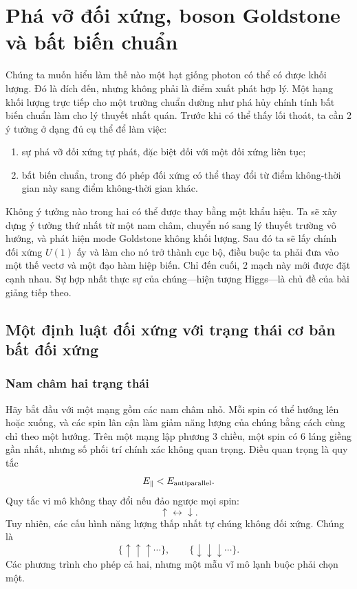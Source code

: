\chapter{Phá vỡ đối xứng, boson Goldstone và bất biến chuẩn}

Chúng ta muốn hiểu làm thế nào một hạt giống photon có thể có được khối lượng. Đó là đích đến, nhưng không phải là điểm xuất phát hợp lý. Một hạng khối lượng trực tiếp cho một trường chuẩn dường như phá hủy chính tính bất biến chuẩn làm cho lý thuyết nhất quán. Trước khi có thể thấy lối thoát, ta cần 2 ý tưởng ở dạng đủ cụ thể để làm việc:
\begin{enumerate}
  \item sự phá vỡ đối xứng tự phát, đặc biệt đối với một đối xứng liên tục;
  \item bất biến chuẩn, trong đó phép đối xứng có thể thay đổi từ điểm không-thời gian này sang điểm không-thời gian khác.
\end{enumerate}
Không ý tưởng nào trong hai có thể được thay bằng một khẩu hiệu. Ta sẽ xây dựng ý tưởng thứ nhất từ một nam châm, chuyển nó sang lý thuyết trường vô hướng, và phát hiện mode Goldstone không khối lượng. Sau đó ta sẽ lấy chính đối xứng \(U(1)\) ấy và làm cho nó trở thành cục bộ, điều buộc ta phải đưa vào một thế vectơ và một đạo hàm hiệp biến. Chỉ đến cuối, 2 mạch này mới được đặt cạnh nhau. Sự hợp nhất thực sự của chúng---hiện tượng Higgs---là chủ đề của bài giảng tiếp theo.

\section{Một định luật đối xứng với trạng thái cơ bản bất đối xứng}

\subsection{Nam châm hai trạng thái}

Hãy bắt đầu với một mạng gồm các nam châm nhỏ. Mỗi spin có thể hướng lên hoặc xuống, và các spin lân cận làm giảm năng lượng của chúng bằng cách cùng chỉ theo một hướng. Trên một mạng lập phương 3 chiều, một spin có 6 láng giềng gần nhất, nhưng số phối trí chính xác không quan trọng. Điều quan trọng là quy tắc
\begin{equation}
  E_{\parallel}<E_{\rm antiparallel}.
\end{equation}
Quy tắc vi mô không thay đổi nếu đảo ngược mọi spin:
\begin{equation}
  \uparrow\longleftrightarrow\downarrow.
\end{equation}
Tuy nhiên, các cấu hình năng lượng thấp nhất tự chúng không đối xứng. Chúng là
\begin{equation}
  \{\uparrow\uparrow\uparrow\cdots\},
  \qquad
  \{\downarrow\downarrow\downarrow\cdots\}.
\end{equation}
Các phương trình cho phép cả hai, nhưng một mẫu vĩ mô lạnh buộc phải chọn một.

